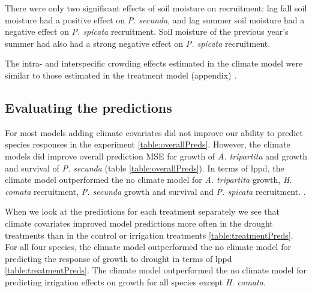 \documentclass[11pt]{article}
\begin{document}
\begin{doublespacing}
There were only two significant effects of soil moisture on recruitment: lag fall soil moisture had a positive effect on \textit{P. secunda}, and lag summer soil moisture had a negative effect on \textit{P. spicata} recruitment. Soil moisture of the previous year's summer had also had a strong negative effect on \textit{P. spicata} recruitment.  

The intra- and interspecific crowding effects estimated in the climate model were similar to those estimated in the treatment model (appendix) \citep{adler_coexistence_2010,chu_direct_2016,chu_large_2015}.

\subsection*{Evaluating the predictions}

For most models adding climate covariates did not improve our ability to predict species responses in the experiment \ref{table:overallPreds}. However, the climate models did improve overall prediction MSE for growth of \textit{A. tripartita} and growth and survival of \textit{P. secunda} (table \ref{table:overallPreds}). In terms of lppd, the climate model outperformed the no climate model for \textit{A. tripartita} growth, \textit{H. comata} recruitment, \textit{P. secunda} growth and survival and \textit{P. spicata} recruitment.  .

When we look at the predictions for each treatment separately we see that climate covariates improved model predictions more often in the drought treatments than in the control or irrigation treatments \ref{table:treatmentPreds}. For all four species, the climate model outperformed the no climate model for predicting the response of growth to drought in terms of lppd \ref{table:treatmentPreds}. The climate model outperformed the no climate model for predicting irrigation effects on growth for all species except \textit{H. comata}. 


\end{doublespacing}
\end{document}
